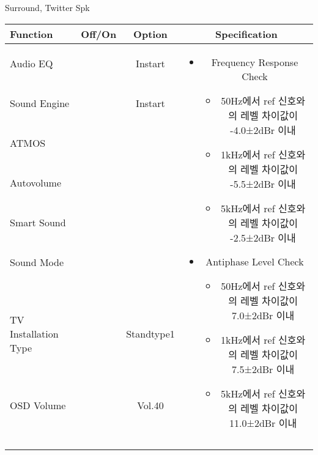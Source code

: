 \begin{frame}[t]{Surround, Twitter Spk}
\begin{tiny}
\begin{tabular}{@{}lccc@{}}
\toprule
Function & Off/On & Option & Specification \\
\midrule
Audio EQ & \color{black}{Off} & Instart &
\multirow{10}{60mm}{
\begin{itemize}
	\vspace{-3mm}
	\item Frequency Response Check
	\begin{itemize}
		\item 50Hz에서 ref 신호와의 레벨 차이값이 -4.0±2dBr 이내
		\item 1kHz에서 ref 신호와의 레벨 차이값이 -5.5±2dBr 이내
		\item 5kHz에서 ref 신호와의 레벨 차이값이 -2.5±2dBr 이내
	\end{itemize}
	\item Antiphase Level Check
	\begin{itemize}
		\item 50Hz에서 ref 신호와의 레벨 차이값이 7.0±2dBr 이내
		\item 1kHz에서 ref 신호와의 레벨 차이값이 7.5±2dBr 이내
		\item 5kHz에서 ref 신호와의 레벨 차이값이 11.0±2dBr 이내
	\end{itemize}
\end{itemize}
} \\
Sound Engine & \color{blue}{On} & Instart & \\
ATMOS & \color{black}{Off}  & & \\
Autovolume & \color{black}{Off} & & \\
Smart Sound & \color{black}{Off} & & \\
Sound Mode & \color{blue}{On} & \color{blue}{Surround} & \\
TV Installation Type & \color{blue}{On} & Standtype1 & \\
OSD Volume & \color{blue}{On} & Vol.40 & \\
& & & \\
& & & \\
& & & \\
& & & \\
\midrule
\end{tabular}
\end{tiny}


\end{frame}
